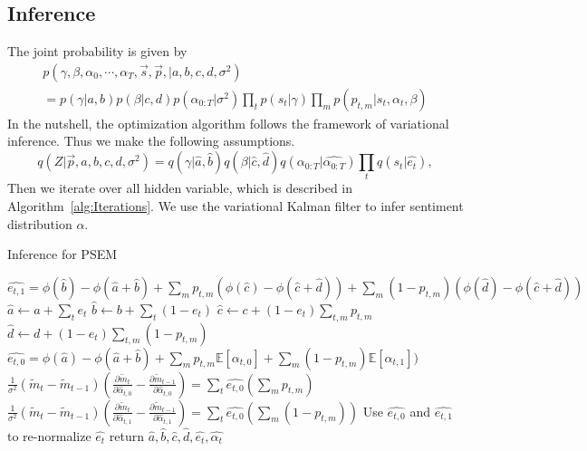 \documentclass[runningheads]{llncs}
\newcommand{\Ep}{\mathbb{E}}
\begin{document}
\subsection{Inference}
The joint probability is given by
\begin{multline}
    p(\gamma,\beta,\alpha_0,\cdots,\alpha_T, \vec{s},\vec{p}, |a,b,c,d,\sigma^2) \\
    =    p(\gamma|a,b) p(\beta|c,d)  p(\alpha_{0:T}|\sigma^2) \prod_t  p(s_{t}|\gamma) \prod_m p(p_{t,m}|s_{t},\alpha_t,\beta) 
\end{multline}
In the nutshell, the optimization algorithm follows the framework of variational inference. Thus we make the following assumptions. 
\begin{equation*}
q(Z|\vec{p},a,b,c,d,\sigma^2) = q(\gamma|\hat{a},\hat{b}) q(\beta|\hat{c},\hat{d}) q(\alpha_{0:T}|\hat{\alpha_{0:T}})\prod_{t} q(s_{t}|\hat{e_{t}}) , 
\end{equation*}
Then we iterate over all hidden variable, which is described in Algorithm~\ref{alg:Iterations}. We use the variational Kalman filter to infer sentiment distribution $\alpha$.

\begin{algorithm}\label{alg:Iterations}
\caption{Inference for PSEM}
\begin{algorithmic}
\STATE $\hat{e_{t,1}} = \phi(\hat{b})-\phi(\hat{a}+\hat{b}) + \sum_{m}  p_{t,m} (\phi(\hat{c})-\phi(\hat{c}+\hat{d})) +\sum_m (1-p_{t,m}) (\phi(\hat{d})-\phi(\hat{c}+\hat{d}))$\;
\STATE $\hat{a} \leftarrow  a+ \sum_{t} e_{t}$\;
\STATE $\hat{b}  \leftarrow  b+ \sum_{t} (1-e_{t})$\;
\STATE $\hat{c}  \leftarrow  c+ (1-e_{t}) \sum_{t,m} p_{t,m}$\;
\STATE $\hat{d}  \leftarrow  d+ (1-e_{t}) \sum_{t,m} (1-p_{t,m})$\;
\STATE $\hat{e_{t,0}}=\phi(\hat{a})-\phi(\hat{a}+\hat{b}) + \sum_{m}  p_{t,m}   \Ep[\alpha_{t,0}] +\sum_m (1-p_{t,m}) \Ep[\alpha_{t,1}])$\;
\STATE $\frac{1}{\sigma^2}(\widetilde{m}_{t}-\widetilde{m}_{t-1})(\frac{\partial \widetilde{m}_{t}}{\partial \hat{\alpha}_{t,0}}-\frac{\partial \widetilde{m}_{t-1}}{\partial \hat{\alpha}_{t,0}}) = \sum_t \hat{e_{t,0}} (\sum_m p_{t,m})$
\STATE $\frac{1}{\sigma^2}(\widetilde{m}_{t}-\widetilde{m}_{t-1})(\frac{\partial \widetilde{m}_{t}}{\partial \hat{\alpha}_{t,1}}-\frac{\partial \widetilde{m}_{t-1}}{\partial \hat{\alpha}_{t,1}}) = \sum_t \hat{e_{t,0}} (\sum_m (1-p_{t,m}))$
\ENDWHILE\;
Use $\hat{e_{t,0}}$ and $\hat{e_{t,1}}$ to re-normalize $\hat{e_{t}}$\;
return $\hat{a},\hat{b},\hat{c},\hat{d},\hat{e_{t}},\hat{\alpha_{t}}$
\end{algorithmic}
\end{algorithm}
\end{document}
